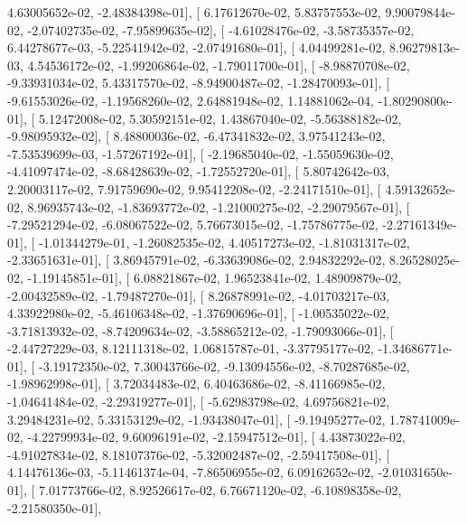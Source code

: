\documentclass{article}
\begin{document}
          4.63005652e-02,  -2.48384398e-01],
       [  6.17612670e-02,   5.83757553e-02,   9.90079844e-02,
         -2.07402735e-02,  -7.95899635e-02],
       [ -4.61028476e-02,  -3.58735357e-02,   6.44278677e-03,
         -5.22541942e-02,  -2.07491680e-01],
       [  4.04499281e-02,   8.96279813e-03,   4.54536172e-02,
         -1.99206864e-02,  -1.79011700e-01],
       [ -8.98870708e-02,  -9.33931034e-02,   5.43317570e-02,
         -8.94900487e-02,  -1.28470093e-01],
       [ -9.61553026e-02,  -1.19568260e-02,   2.64881948e-02,
          1.14881062e-04,  -1.80290800e-01],
       [  5.12472008e-02,   5.30592151e-02,   1.43867040e-02,
         -5.56388182e-02,  -9.98095932e-02],
       [  8.48800036e-02,  -6.47341832e-02,   3.97541243e-02,
         -7.53539699e-03,  -1.57267192e-01],
       [ -2.19685040e-02,  -1.55059630e-02,  -4.41097474e-02,
         -8.68428639e-02,  -1.72552720e-01],
       [  5.80742642e-03,   2.20003117e-02,   7.91759690e-02,
          9.95412208e-02,  -2.24171510e-01],
       [  4.59132652e-02,   8.96935743e-02,  -1.83693772e-02,
         -1.21000275e-02,  -2.29079567e-01],
       [ -7.29521294e-02,  -6.08067522e-02,   5.76673015e-02,
         -1.75786775e-02,  -2.27161349e-01],
       [ -1.01344279e-01,  -1.26082535e-02,   4.40517273e-02,
         -1.81031317e-02,  -2.33651631e-01],
       [  3.86945791e-02,  -6.33639086e-02,   2.94832292e-02,
          8.26528025e-02,  -1.19145851e-01],
       [  6.08821867e-02,   1.96523841e-02,   1.48909879e-02,
         -2.00432589e-02,  -1.79487270e-01],
       [  8.26878991e-02,  -4.01703217e-03,   4.33922980e-02,
         -5.46106348e-02,  -1.37690696e-01],
       [ -1.00535022e-02,  -3.71813932e-02,  -8.74209634e-02,
         -3.58865212e-02,  -1.79093066e-01],
       [ -2.44727229e-03,   8.12111318e-02,   1.06815787e-01,
         -3.37795177e-02,  -1.34686771e-01],
       [ -3.19172350e-02,   7.30043766e-02,  -9.13094556e-02,
         -8.70287685e-02,  -1.98962998e-01],
       [  3.72034483e-02,   6.40463686e-02,  -8.41166985e-02,
         -1.04641484e-02,  -2.29319277e-01],
       [ -5.62983798e-02,   4.69756821e-02,   3.29484231e-02,
          5.33153129e-02,  -1.93438047e-01],
       [ -9.19495277e-02,   1.78741009e-02,  -4.22799934e-02,
          9.60096191e-02,  -2.15947512e-01],
       [  4.43873022e-02,  -4.91027834e-02,   8.18107376e-02,
         -5.32002487e-02,  -2.59417508e-01],
       [  4.14476136e-03,  -5.11461374e-04,  -7.86506955e-02,
          6.09162652e-02,  -2.01031650e-01],
       [  7.01773766e-02,   8.92526617e-02,   6.76671120e-02,
         -6.10898358e-02,  -2.21580350e-01],
\end{document}
